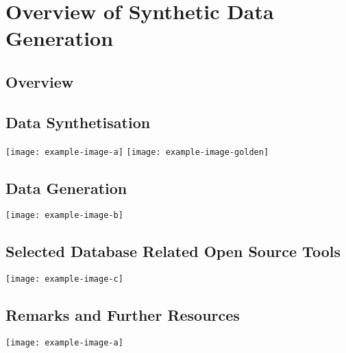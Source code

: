 \chapter{Overview of Synthetic Data Generation}
\section{Overview}
\lipsum[5-6]
\section{Data Synthetisation}
\lipsum[6-8]
\noindent\texttt{[image: example-image-a]}\qquad
\texttt{[image: example-image-golden]}\qquad
\section{Data Generation}
\lipsum[8-9]
\noindent\texttt{[image: example-image-b]} 
\section{Selected Database Related Open Source Tools }
\lipsum[8-9]
\noindent\texttt{[image: example-image-c]} 
\section{Remarks and Further Resources}
\lipsum[8-9]
\noindent\texttt{[image: example-image-a]} 